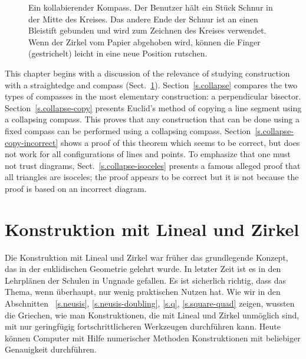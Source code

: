\begin{figure}[htb]
\begin{minipage}{.45\textwidth}
\caption{Ein kollabierender Kompass. Der Benutzer hält ein Stück Schnur in der Mitte des Kreises. Das andere Ende der Schnur ist an einen Bleistift gebunden und wird zum Zeichnen des Kreises verwendet. Wenn der Zirkel vom Papier abgehoben wird, können die Finger (gestrichelt) leicht in eine neue Position rutschen.}\label{fig.collapsing-compass}
\end{minipage}
\end{figure}

This chapter begins with a discussion of the relevance of studying construction with a straightedge and compass (Sect.~\ref{s.relevance}).
Section~\ref{s.collapse} compares the two types of compasses in the most elementary construction: a perpendicular bisector. Section~\ref{s.collapse-copy} presents Euclid's method of copying a line segment using a collapsing compass. This proves that any construction that can be done using a fixed compass can be performed using a collapsing compass. Section~\ref{s.collapse-copy-incorrect} shows a proof of this theorem which seems to be correct, but does not work for all configurations of lines and points. To emphasize that one must not trust diagrams, Sect.~\ref{s.collapse-isoceles} presents a famous alleged proof that all triangles are isoceles; the proof appears to be correct but it is not because the proof is based on an incorrect diagram.

\section{Konstruktion mit Lineal und Zirkel}\label{s.relevance}

Die Konstruktion mit Lineal und Zirkel war früher das grundlegende Konzept, das in der euklidischen Geometrie gelehrt wurde. In letzter Zeit ist es in den Lehrplänen der Schulen in Ungnade gefallen. Es ist sicherlich richtig, dass das Thema, wenn überhaupt, nur wenig praktischen Nutzen hat. Wie wir in den Abschnitten ~\ref{s.neusis}, \ref{s.neusis-doubling}, \ref{s.q}, \ref{s.square-quad} zeigen, wussten die Griechen, wie man Konstruktionen, die mit Lineal und Zirkel unmöglich sind, mit nur geringfügig fortschrittlicheren Werkzeugen durchführen kann. Heute können Computer mit Hilfe numerischer Methoden Konstruktionen mit beliebiger Genauigkeit durchführen.

